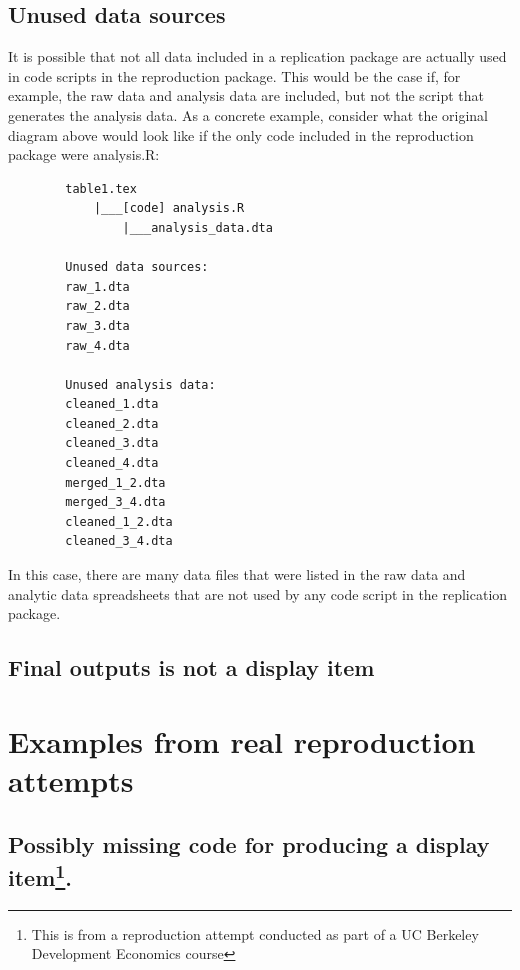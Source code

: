 \documentclass[
  openany]{book}
\begin{document}
\hypertarget{unused-data-sources}{%
\subsection{Unused data sources}\label{unused-data-sources}}

It is possible that not all data included in a replication package are actually used in code scripts in the reproduction package. This would be the case if, for example, the raw data and analysis data are included, but not the script that generates the analysis data. As a concrete example, consider what the original diagram above would look like if the only code included in the reproduction package were analysis.R:

\begin{verbatim}
        table1.tex
            |___[code] analysis.R
                |___analysis_data.dta

        Unused data sources:
        raw_1.dta
        raw_2.dta
        raw_3.dta
        raw_4.dta

        Unused analysis data:
        cleaned_1.dta
        cleaned_2.dta
        cleaned_3.dta
        cleaned_4.dta
        merged_1_2.dta
        merged_3_4.dta
        cleaned_1_2.dta
        cleaned_3_4.dta
\end{verbatim}

In this case, there are many data files that were listed in the raw data and analytic data spreadsheets that are not used by any code script in the replication package.

\hypertarget{final-outputs-is-not-a-display-item}{%
\subsection{Final outputs is not a display item}\label{final-outputs-is-not-a-display-item}}

\hypertarget{examples-from-real-reproduction-attempts}{%
\section{Examples from real reproduction attempts}\label{examples-from-real-reproduction-attempts}}

\hypertarget{possibly-missing-code-for-producing-a-display-item.}{%
\subsection[Possibly missing code for producing a display item.]{\texorpdfstring{Possibly missing code for producing a display item\footnote{This is from a reproduction attempt conducted as part of a UC Berkeley Development Economics course}.}{Possibly missing code for producing a display item.}}\label{possibly-missing-code-for-producing-a-display-item.}}
\end{document}
